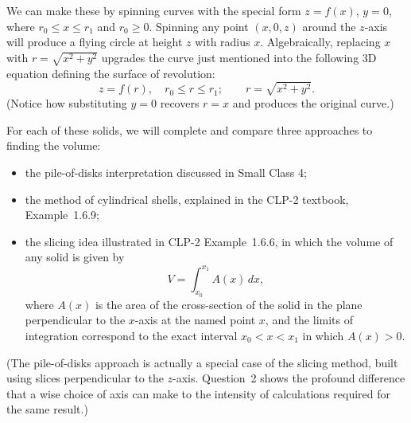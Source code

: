 \documentclass{exam}
\begin{document}
We can make these by spinning curves with the special
form $z=f(x)$, $y=0$, where $r_0\le x\le r_1$ and $r_0\ge0$.
Spinning any point $(x,0,z)$ around the $z$-axis will produce a flying
circle at height $z$ with radius $x$.
Algebraically, replacing $x$ with $r=\sqrt{x^2+y^2}$
upgrades the curve just mentioned into the following
3D equation defining the surface of revolution:
\[
z = f(r),\quad r_0\le r\le r_1;
\qquad r=\sqrt{x^2+y^2}.
\]
(Notice how substituting $y=0$ recovers $r=x$ and produces the original curve.)

\goodbreak

\noindent
For each of these solids, 
we will complete and compare three approaches to finding the volume:
\begin{itemize}
\item the pile-of-disks interpretation discussed in Small Class 4;
\item the method of cylindrical shells, explained in the CLP-2 textbook, Example~1.6.9;
\item the slicing idea illustrated in CLP-2 Example~1.6.6, in which
the volume of any solid is given by
\[
V = \int_{x_0}^{x_1} A(x)\,dx,
\]
where $A(x)$ is the area of the cross-section of the solid in the
plane perpendicular to the $x$-axis at the named point $x$,
and the limits of integration correspond to the exact interval 
$x_0< x< x_1$
in which $A(x)>0$.
\end{itemize}

\noindent
(The pile-of-disks approach is actually a special case of the
slicing method, built using slices perpendicular to the $z$-axis.
Question~2 shows the profound difference that a wise choice of axis 
can make to the intensity of calculations required for the same result.)
\end{document}
